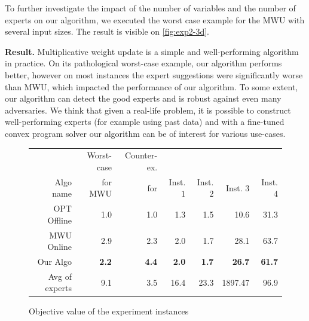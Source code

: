 To further investigate the impact of the number of variables and the number of experts on our algorithm, we executed the worst case example for the MWU with several input sizes. The result is visible on \cref{fig:exp2-3d}.

\textbf{Result.} Multiplicative weight update is a simple and well-performing algorithm in practice. On its pathological worst-case example, our algorithm performs better, however on most instances the expert suggestions were significantly worse than MWU, which impacted the performance of our algorithm. To some extent, our algorithm can detect the good experts and is robust against even many adversaries. We think that given a real-life problem, it is possible to construct well-performing experts (for example using past data) and with a fine-tuned convex program solver our algorithm can be of interest for various use-cases.

\begin{figure}[!ht]
\centering
\begin{tabular}{r|r|r|r|r|r|r}
          & Worst-case & Counter-ex. & & & & \\
Algo name & for MWU  & for \cite{AnandGe22:Online-Algorithms} & Inst. $1$ & Inst. $2$ & Inst. $3$ & Inst. $4$\\
\hline
OPT Offline            & 1.0 & 1.0 & 1.3 & 1.5 & 10.6 & 31.3 \\
MWU Online             & 2.9 & 2.3 & 2.0 & 1.7 & 28.1 & 63.7 \\
\hline
Our Algo           & {\bf 2.2} & {\bf 4.4} & {\bf 2.0} & {\bf 1.7} & {\bf 26.7}  & {\bf 61.7} \\
\hline
Avg of experts      & 9.1 & 3.5 & 16.4 & 23.3 & 1897.47 & 96.9 \\
\end{tabular}
\caption{Objective value of the experiment instances}
\label{fig:exp-objective}
\end{figure}

